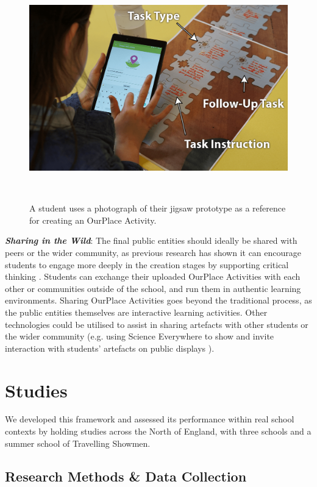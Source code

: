 \documentclass[,hyphens]{sigchi}
\begin{document}
\begin{figure}
\centering
  \includegraphics[width=1\columnwidth]{figures/jigsawToApp}
  \caption{A student uses a photograph of their jigsaw prototype as a reference for creating an OurPlace Activity.}~\label{fig:JigsawToApp}
  \vspace{-2em}
\end{figure}

\textit{\textbf{Sharing in the Wild}}: The final public entities should ideally be shared with peers or the wider community, as previous research has shown it can encourage students to engage more deeply in the creation stages by supporting critical thinking \cite{Sarangapani2018}. Students can exchange their uploaded OurPlace Activities with each other or communities outside of the school, and run them in authentic learning environments. Sharing OurPlace Activities goes beyond the traditional process, as the public entities themselves are interactive learning activities. Other technologies could be utilised to assist in sharing artefacts with other students or the wider community (e.g. using Science Everywhere to show and invite interaction with students' artefacts on public displays \cite{ahn2018}).

\section{Studies}
\label{Studies}
We developed this framework and assessed its performance within real school contexts by holding studies across the North of England, with three schools and a summer school of Travelling Showmen.

\subsection{Research Methods \& Data Collection}
\end{document}

